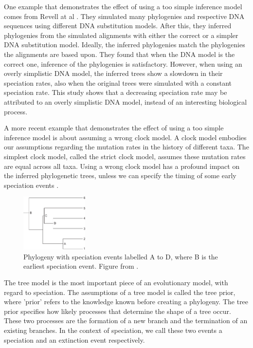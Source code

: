One example that demonstrates the effect of using a too simple inference model
comes from Revell at al \cite{revell2005under}.
They simulated many phylogenies and respective DNA sequences 
using different DNA substitution models. 
After this, they inferred phylogenies from the simulated alignments
with either the correct or a simpler DNA substitution model. 
Ideally, the inferred phylogenies match the phylogenies the alignments are based upon.
They found that when the DNA model is the correct one, inference of the
phylogenies is satisfactory.
However, when using an overly simplistic DNA model, 
the inferred trees show a slowdown in their speciation rates, 
also when the original trees were simulated with a constant speciation rate.
This study shows that a decreasing speciation rate may be attributed
to an overly simplistic DNA model, instead of an interesting biological process.

A more recent example that demonstrates the effect of using a too simple 
inference model is about assuming a wrong clock model. 
A clock model embodies our assumptions regarding the mutation rates in
the history of different taxa. The simplest clock model, called the strict
clock model, assumes these mutation rates are equal across all taxa.
Using a wrong clock model has a profound impact 
on the inferred phylogenetic trees, unless we can
specify the timing of some early speciation events \cite{duchene2014impact}.

\begin{figure}[H]
  \includegraphics[width=0.3\textwidth]{duchene_et_al_2014_fig_1.png}
  \caption{
    Phylogeny with speciation events labelled A to D,
    where B is the earliest speciation event.
    Figure from \cite{duchene2014impact}.
 }
  \label{fig:duchene2014impact}
\end{figure}

The tree model is the most important piece of an evolutionary model,
with regard to speciation. The assumptions of a tree model is 
called the tree prior, where 'prior' refers to the knowledge
known before creating a phylogeny. The tree prior specifies how likely
processes that determine the shape of a tree occur. These
two processes are the formation of a new branch and the termination of
an existing branches. In the context of speciation, we call these
two events a speciation and an extinction event respectively.


